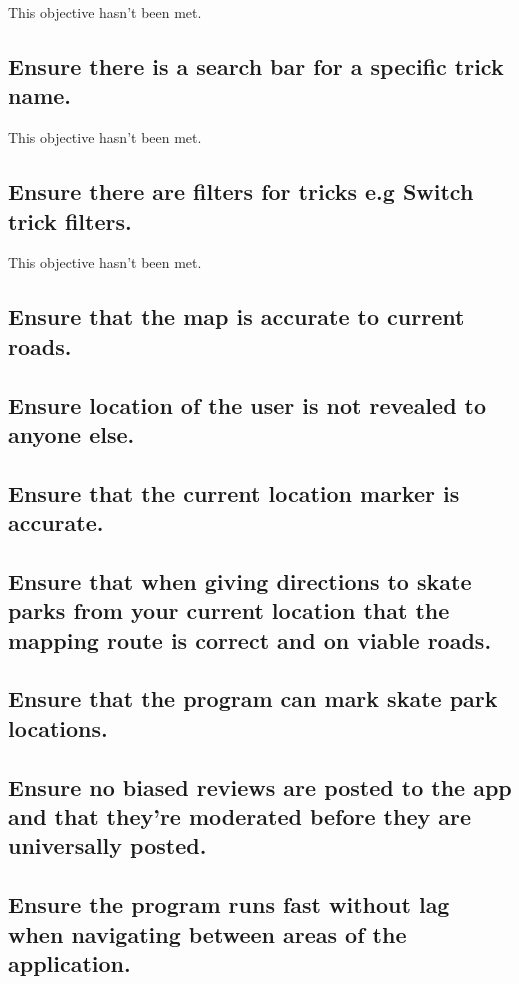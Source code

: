 This objective hasn't been met.

\subsection {Ensure there is a search bar for a specific trick name.}

This objective hasn't been met.

\subsection {Ensure there are filters for tricks e.g Switch trick filters.}

This objective hasn't been met.



\subsection {Ensure that the map is accurate to current roads.}

\subsection {Ensure location of the user is not revealed to anyone else.}

\subsection {Ensure that the current location marker is accurate.}

\subsection {Ensure that when giving directions to skate parks from your current location that the mapping route is correct and on viable roads. }

\subsection {Ensure that the program can mark skate park locations.}


\subsection {Ensure no biased reviews are posted to the app and that they're moderated before they are universally posted.}

\subsection {Ensure the program runs fast without lag when navigating between areas of the application.}



